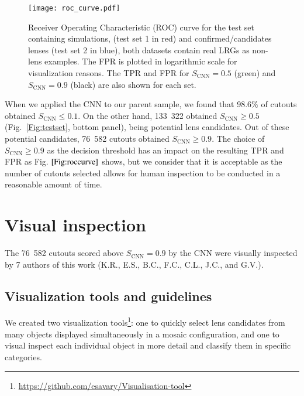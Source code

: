 \documentclass[tradiabstract,twocolumn]{aa}
\begin{document}
\begin{figure}[t!]
\centering
\texttt{[image: roc\_curve.pdf]}
\caption{ Receiver Operating Characteristic (ROC) curve for the test set containing simulations, (test set 1 in red) and confirmed/candidates lenses (test set 2 in blue), both datasets contain real LRGs as non-lens examples. The FPR is plotted in logarithmic scale for visualization reasons. The TPR and FPR for $S_{\text{CNN}}=0.5$ (green) and $S_{\text{CNN}} = 0.9$ (black) are also shown for each set.}
\label{Fig:roccurve}
\end{figure}


When we applied the CNN to our parent sample, we found that 98.6$\%$ of cutouts obtained $S_{\text{CNN}} \leq 0.1$. On the other hand, 133~322 obtained $S_{\text{CNN}} \geq 0.5$ (Fig.~\ref{Fig:testset}, bottom panel), being potential lens candidates. Out of these potential candidates, 76~582 cutouts obtained $S_{\text{CNN}} \geq 0.9$. The choice of $S_{\text{CNN}} \geq 0.9$ as the decision threshold has an impact on the resulting TPR and FPR as Fig. $\ref{Fig:roccurve}$ shows, but we consider that it is acceptable as the number of cutouts selected allows for human inspection to be conducted in a reasonable amount of time. 


\section{Visual inspection}\label{sec:visualinspec}
%

The 76~582 cutouts scored above $S_{\text{CNN}}=0.9$ by the CNN were visually inspected by 7 authors of this work (K.R., E.S., B.C., F.C., C.L., J.C., and G.V.). 

\subsection{Visualization tools and guidelines}\label{subsec:vis_tool_guid}

We created two visualization tools\footnote{\url{https://github.com/esavary/Visualisation-tool}}: one to quickly select lens candidates from many objects displayed simultaneously in a mosaic configuration, and one to visual inspect each individual object in more detail and classify them in specific categories. 
\end{document}
